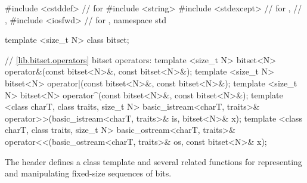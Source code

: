\begin{codeblock}
#include <cstddef>              // for 
#include <string>
#include <stdexcept>            // for ,
                                //       , 
#include <iosfwd>               // for , 
namespace std {
  template <size_t N> class bitset;

  // \ref{lib.bitset.operators} bitset operators:
  template <size_t N>
    bitset<N> operator&(const bitset<N>&, const bitset<N>&);
  template <size_t N>
    bitset<N> operator|(const bitset<N>&, const bitset<N>&);
  template <size_t N>
    bitset<N> operator^(const bitset<N>&, const bitset<N>&);
  template <class charT, class traits, size_t N>
    basic_istream<charT, traits>&
    operator>>(basic_istream<charT, traits>& is, bitset<N>& x);
  template <class charT, class traits, size_t N>
    basic_ostream<charT, traits>&
    operator<<(basic_ostream<charT, traits>& os, const bitset<N>& x);
}
\end{codeblock}

\pnum
The header
defines a
class template
and several related functions for representing
and manipulating fixed-size sequences of bits.

